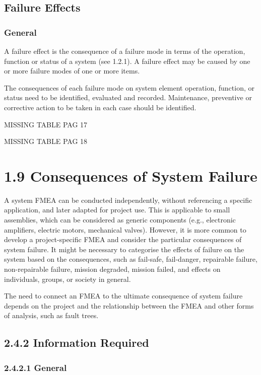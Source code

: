 \documentclass[./dissertation.tex]{subfiles}
\begin{document}
\subsection{Failure Effects}
\subsubsection{General}
A failure effect is the consequence of a failure mode in terms of the operation, function or status of a system (see 1.2.1). A failure effect may be caused by one or more failure modes of one or more items.

The consequences of each failure mode on system element operation, function, or status need to be identified, evaluated and recorded. Maintenance, preventive or corrective action to be taken in each case should be identified.

MISSING TABLE PAG 17

MISSING TABLE PAG 18

\section{1.9 Consequences of System Failure}

A system FMEA can be conducted independently, without referencing a specific application, and later adapted for project use. This is applicable to small assemblies, which can be considered as generic components (e.g., electronic amplifiers, electric motors, mechanical valves). However, it is more common to develop a project-specific FMEA and consider the particular consequences of system failure. It might be necessary to categorise the effects of failure on the system based on the consequences, such as fail-safe, fail-danger, repairable failure, non-repairable failure, mission degraded, mission failed, and effects on individuals, groups, or society in general.

The need to connect an FMEA to the ultimate consequence of system failure depends on the project and the relationship between the FMEA and other forms of analysis, such as fault trees.

\subsection{2.4.2 Information Required}

\subsubsection{2.4.2.1 General}
\end{document}
